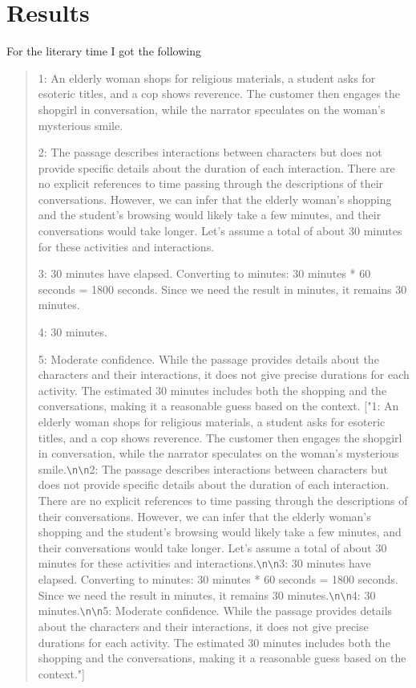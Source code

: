 \documentclass[12pt]{article}
\begin{document}
    \section*{Results}
    For the literary time I got the following
    \begin{quotation}
        1: An elderly woman shops for religious materials, a student asks for esoteric
        titles, and a cop shows reverence. The customer then engages the shopgirl
        in conversation, while the narrator speculates on the woman's mysterious
        smile.

        2: The passage describes interactions between characters but does not provide
        specific details about the duration of each interaction. There are no
        explicit references to time passing through the descriptions of their
        conversations. However, we can infer that the elderly woman's shopping
        and the student's browsing would likely take a few minutes, and their conversations
        would take longer. Let's assume a total of about 30 minutes for these
        activities and interactions.

        3: 30 minutes have elapsed. Converting to minutes: 30 minutes * 60 seconds
        = 1800 seconds. Since we need the result in minutes, it remains 30 minutes.

        4: 30 minutes.

        5: Moderate confidence. While the passage provides details about the
        characters and their interactions, it does not give precise durations for
        each activity. The estimated 30 minutes includes both the shopping and
        the conversations, making it a reasonable guess based on the context. ["1:
        An elderly woman shops for religious materials, a student asks for
        esoteric titles, and a cop shows reverence. The customer then engages
        the shopgirl in conversation, while the narrator speculates on the woman's
        mysterious smile.\verb|\n\n|2: The passage describes interactions between
        characters but does not provide specific details about the duration of each
        interaction. There are no explicit references to time passing through
        the descriptions of their conversations. However, we can infer that the
        elderly woman's shopping and the student's browsing would likely take a
        few minutes, and their conversations would take longer. Let's assume a
        total of about 30 minutes for these activities and interactions.\verb|\n\n|3:
        30 minutes have elapsed. Converting to minutes: 30 minutes * 60 seconds
        = 1800 seconds. Since we need the result in minutes, it remains 30
        minutes.\verb|\n\n|4: 30 minutes.\verb|\n\n|5: Moderate confidence. While
        the passage provides details about the characters and their interactions,
        it does not give precise durations for each activity. The estimated 30 minutes
        includes both the shopping and the conversations, making it a reasonable
        guess based on the context."]
    \end{quotation}
\end{document}
